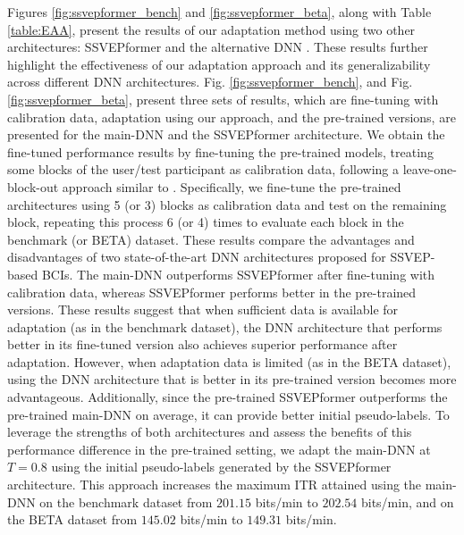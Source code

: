 \documentclass[12pt]{iopart}
\begin{document}
Figures \ref{fig:ssvepformer_bench} and \ref{fig:ssvepformer_beta}, along with Table \ref{table:EAA}, present the results of our adaptation method using two other architectures: SSVEPformer \cite{ssvepformer} and the alternative DNN \cite{another_network}. These results further highlight the effectiveness of our adaptation approach and its generalizability across different DNN architectures. Fig. \ref{fig:ssvepformer_bench}, and Fig. \ref{fig:ssvepformer_beta}, present three sets of results, which are fine-tuning with calibration data, adaptation using our approach, and the pre-trained
versions, are presented for the main-DNN \cite{ournetwork} and the SSVEPformer \cite{ssvepformer} architecture. We obtain the fine-tuned performance results by fine-tuning the pre-trained models, treating some blocks of the user/test participant as calibration data, following a leave-one-block-out approach similar to \cite{ournetwork}. Specifically, we fine-tune the pre-trained architectures using 5 (or 3) blocks as calibration data and test on the remaining block, repeating this process 6 (or 4) times to evaluate each block in the benchmark (or BETA) dataset. These results compare the advantages and disadvantages of two state-of-the-art DNN architectures proposed for SSVEP-based BCIs. The main-DNN \cite{ournetwork} outperforms SSVEPformer \cite{ssvepformer} after fine-tuning with calibration data, whereas SSVEPformer performs better in the pre-trained versions. These results suggest that when sufficient data is available for adaptation (as in the benchmark dataset), the DNN architecture that performs better in its fine-tuned version also achieves superior performance after adaptation. However, when adaptation data is limited (as in the BETA dataset), using the DNN architecture that is better in its pre-trained version becomes more advantageous. Additionally, since the pre-trained SSVEPformer outperforms the pre-trained main-DNN on average, it can provide better initial pseudo-labels. To leverage the strengths of both architectures and assess the benefits of this performance difference in the pre-trained setting, we adapt the main-DNN at $T=0.8$ using the initial pseudo-labels generated by the SSVEPformer architecture. This approach increases the maximum ITR attained using the main-DNN on the benchmark dataset from $201.15$ bits/min to $202.54$ bits/min, and on the BETA dataset from $145.02$ bits/min to $149.31$ bits/min.
\end{document}
